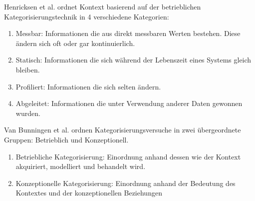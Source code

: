 Henricksen et al.\cite{henricksen2003framework} ordnet Kontext basierend auf der betrieblichen Kategorisierungstechnik in 4 verschiedene Kategorien:
\begin{enumerate}
\item {Messbar: Informationen die aus direkt messbaren Werten bestehen. Diese ändern sich oft oder gar kontinuierlich. }
\item {Statisch: Informationen die sich während der Lebenszeit eines Systems gleich bleiben.}
\item {Profiliert: Informationen die sich selten ändern.}
\item {Abgeleitet: Informationen die unter Verwendung anderer Daten gewonnen wurden. }

\end{enumerate}

Van Bunningen et al. \cite{van2005context} ordnen Kategorisierungsversuche in zwei übergeordnete Gruppen: Betrieblich und Konzeptionell. 
\begin{enumerate}
\item{Betriebliche Kategorisierung: Einordnung anhand dessen wie der Kontext akquiriert, modelliert und behandelt wird.}
\item{Konzeptionelle Kategorisierung: Einordnung anhand der Bedeutung des Kontextes und der konzeptionellen Beziehungen} %
\end{enumerate}


